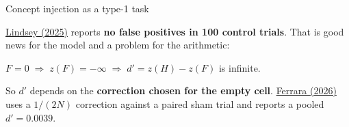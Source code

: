 \documentclass[aspectratio=169,11pt]{beamer}
\newcommand{\site}{https://measuring-introspection.github.io/measuring-introspection}
\begin{document}
\begin{frame}[label=injection]{Concept injection as a type-1 task}

\vspace{0.1em}
\begin{center}
\end{center}

\vspace{0.1em}
{\small \href{\site/papers/lindsey-2025/}{Lindsey (2025)} reports \textbf{no false positives in 100 control trials}. That is good news for the model and a problem for the arithmetic:}

\vspace{-0.2em}
\begin{center}
$F = 0 \;\Rightarrow\; z(F) = -\infty \;\Rightarrow\; d' = z(H) - z(F)$ is infinite.
\end{center}

{\small So $d'$ depends on the \textbf{correction chosen for the empty cell}. \href{\site/papers/ferrara-2026/}{Ferrara (2026)} uses a $1/(2N)$ correction against a paired sham trial and reports a pooled $d' = 0.0039$.}
\end{frame}
\end{document}
